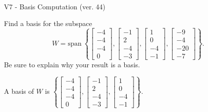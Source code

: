 \begin{exercise}
  \begin{exerciseTitle}V7 - Basis Computation (ver. 44)\end{exerciseTitle}
  \begin{exerciseStatement}
    Find a basis for the subspace 
\[W=\mathrm{span}\ \left\{\left[\begin{array}{r}
-4 \\
-4 \\
-4 \\
0
\end{array}\right] , \left[\begin{array}{r}
-1 \\
2 \\
-4 \\
-3
\end{array}\right] , \left[\begin{array}{r}
1 \\
0 \\
-4 \\
-1
\end{array}\right] , \left[\begin{array}{r}
-9 \\
-4 \\
-20 \\
-7
\end{array}\right]\right\}.\]
 Be sure to explain why your result is a basis.


  \end{exerciseStatement}
  \begin{exerciseAnswer}
   A basis of \(W\) is  \(\left\{\left[\begin{array}{r}
-4 \\
-4 \\
-4 \\
0
\end{array}\right] , \left[\begin{array}{r}
-1 \\
2 \\
-4 \\
-3
\end{array}\right] , \left[\begin{array}{r}
1 \\
0 \\
-4 \\
-1
\end{array}\right]\right\}\).
  


  \end{exerciseAnswer}
\end{exercise}